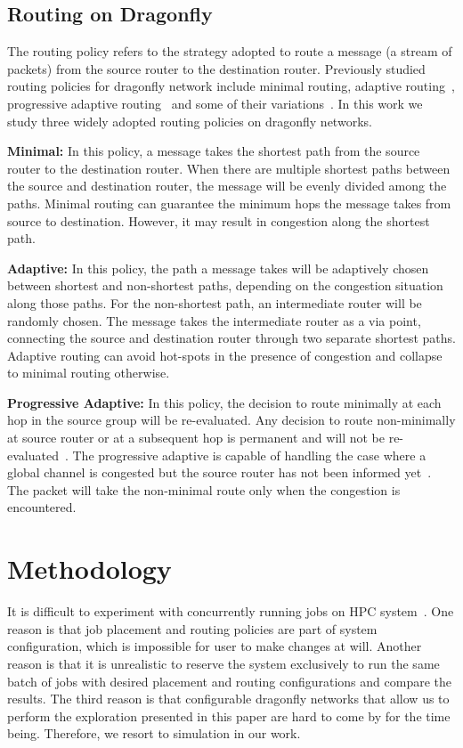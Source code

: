 \documentclass[conference,compsoc]{IEEEtran}
\begin{document}
\subsection{Routing on Dragonfly}
\label{sec:routing-schemes}

The routing policy refers to the strategy adopted to route a message (a stream of packets) from the source router to the destination router. Previously studied routing policies for dragonfly network include minimal routing, adaptive routing~\cite{dally-dragonfly}, progressive adaptive routing~\cite{jiang} and some of their variations~\cite{won-prog-adaptive}. In this work we study three widely adopted routing policies on dragonfly networks.

\textbf{Minimal:} In this policy, a message takes the shortest path from the source router to the destination router. When there are multiple shortest paths between the source and destination router, the message will be evenly divided among the paths. Minimal routing can guarantee the minimum hops the message takes from source to destination. However, it may result in congestion along the shortest path. 

\textbf{Adaptive:} In this policy, the path a message takes will be adaptively chosen between shortest and non-shortest paths, depending on the congestion situation along those paths. For the non-shortest path, an intermediate router will be randomly chosen. The message takes the intermediate router as a via point, connecting the source and destination router through two separate shortest paths. Adaptive routing can avoid hot-spots in the presence of congestion and collapse to minimal routing otherwise. 

\textbf{Progressive Adaptive:} In this policy, the decision to route minimally at each hop in the source group will be re-evaluated. Any decision to route non-minimally at source router or at a subsequent hop is permanent and will not be re-evaluated~\cite{jiang}. The progressive adaptive is capable of handling the case where a global channel is congested but the source router has not been informed yet~\cite{jiang}. The packet will take the non-minimal route only when the congestion is encountered. 



\section{Methodology}
\label{sec: methodology}

It is difficult to experiment with concurrently running jobs on HPC system~\cite{zhou-ipdps-2015}\cite{jain-sc14}\cite{bhatele-sc11}\cite{jokanovic-ipdps-2015}. One reason is that job placement and routing policies are part of system configuration, which is impossible for user to make changes at will. Another reason is that it is unrealistic to reserve the system exclusively to run the same batch of jobs with desired placement and routing configurations and compare the results. The third reason is that configurable dragonfly networks that allow us to perform the exploration presented in this paper are hard to come by for the time being. Therefore, we resort to simulation in our work.
\end{document}
